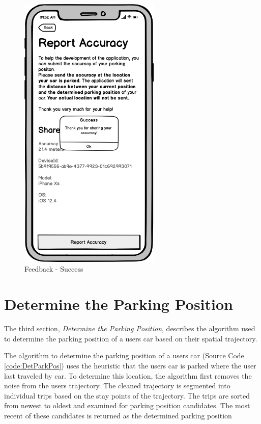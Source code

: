 \begin{figure}[h]
\begin{minipage}[b]{0.49\textwidth}
    \includegraphics[width=0.6\textwidth]{images/UI/Iteration4-Feedback-Success.png}
    \caption{Feedback - Success}
    \label{fig:feedback-succ}
  \end{minipage}
\end{figure}

\section{Determine the Parking Position}
The third section, \textit{Determine the Parking Position}, describes the algorithm used to determine the parking position of a users car based on their spatial trajectory. 

The algorithm to determine the parking position of a users car (Source Code \ref{code:DetParkPos}) uses the heuristic that the users car is parked where the user last traveled by car. To determine this location, the algorithm first removes the noise from the users trajectory. The cleaned trajectory is segmented into individual trips based on the stay points of the trajectory. The trips are sorted from newest to oldest and examined for parking position candidates. The most recent of these candidates is returned as the determined parking position


